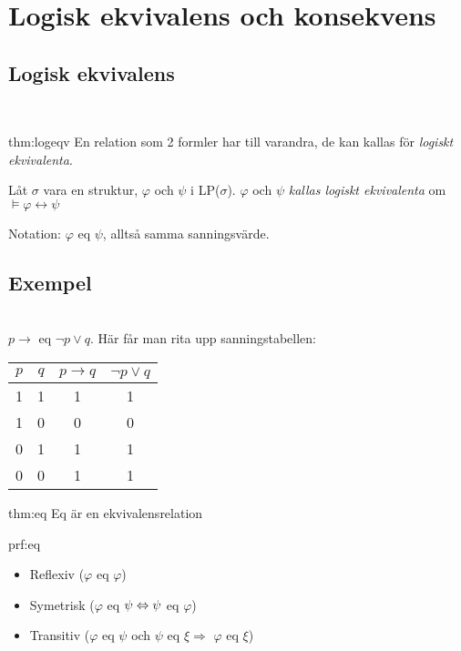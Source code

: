 \section{Logisk ekvivalens och konsekvens}

\subsection{Logisk ekvivalens}\hfill\\

\begin{theo}{thm:logeqv}
  En relation som 2 formler har till varandra, de kan kallas för \textit{logiskt ekvivalenta}.
  \par\bigskip
  \noindent Låt $\sigma$ vara en struktur, $\varphi$ och $\psi$ i LP($\sigma$). $\varphi$ och $\psi$ \textit{kallas logiskt ekvivalenta} om $\vDash\varphi\leftrightarrow\psi$
  \par\bigskip
  \noindent Notation: $\varphi$ eq $\psi$, alltså samma sanningsvärde.
\end{theo}

\subsection{Exempel}\hfill\\

\noindent $p\rightarrow$ eq $\neg p\vee q$. Här får man rita upp sanningstabellen:

\begin{center}
  \begin{tabular}{|c|c|c|c|}
    \hline
    $p$&$q$&$p\rightarrow q$&$\neg p\vee q$\\
    \hline
    1&1&1&1\\
    \hline
    1&0&0&0\\
    \hline
    0&1&1&1\\
    \hline
    0&0&1&1\\
    \hline
  \end{tabular}
\end{center}

\begin{theo}[Eq]{thm:eq}
  Eq är en ekvivalensrelation
\end{theo}
\par\bigskip

\begin{prf}[Eq]{prf:eq}
  \begin{itemize}
    \item Reflexiv ($\varphi$ eq $\varphi$)
    \item Symetrisk ($\varphi$ eq $\psi \Leftrightarrow\psi$ eq $\varphi$)
    \item Transitiv ($\varphi$ eq $\psi$ och $\psi$ eq $\xi\Rightarrow$ $\varphi$ eq $\xi$)
  \end{itemize}
\end{prf}
\par\bigskip

